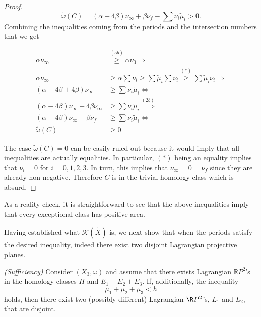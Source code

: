 \begin{proof}
\[\tilde{\omega}(C)=(\alpha-4\beta)\nu_\infty+\beta\nu_f-\sum\nu_i\tilde{\mu}_i>0.\]
Combining the inequalities coming from the periods and the intersection numbers that we get

\begin{align*}
    \alpha\nu_\infty&\overset{(5b)}\geq \alpha\nu_0\Rightarrow\\
    \alpha\nu_\infty &\geq \alpha\sum\nu_i\geq \sum \tilde{\mu}_i\sum\nu_i\overset{(*)}\geq \sum\tilde{\mu}_i\nu_i\Rightarrow\\
    (\alpha-4\beta+4\beta)\nu_\infty&\geq\sum\nu_i\tilde{\mu_i}\Leftrightarrow\\
    (\alpha-4\beta)\nu_\infty+4\beta\nu_\infty&\geq \sum\nu_i\tilde{\mu}_i\overset{(2b)}{\Rightarrow}\\
    (\alpha-4\beta)\nu_\infty+\beta\nu_f&\geq\sum\nu_i\tilde{\mu}_i\Leftrightarrow\\
    \tilde{\omega}(C)&\geq 0
\end{align*}

The case $\tilde{\omega}(C)=0$ can be easily ruled out because it would imply that all inequalities are actually equalities. In particular, $(*)$ being an equality implies that $\nu_i=0$ for $i=0,1,2,3$. In turn, this implies that $\nu_\infty=0=\nu_f$ since they are already non-negative. Therefore $C$ is in the trivial homology class which is absurd. 
\end{proof}

\begin{remark}
As a reality check, it is straightforward to see that the above inequalities imply that every exceptional class has positive area.
\end{remark}

Having established what $\mathcal{K}(\widetilde{X})$ is, we next show that when the periods satisfy the desired inequality, indeed there exist two disjoint Lagrangian projective planes.



\begin{proposition}\emph{(Sufficiency)}
Consider $(X_3,\omega)$ and assume that there exists Lagrangian $\mathbb{R}P^2$'s in the homology classes $H$ and $E_1+E_2+E_3$. If, additionally, the inequality
\[\mu_1+\mu_2+\mu_3<h\]
holds, then there exist two (possibly different) Lagrangian $\R P^2$'s, $L_1$ and $L_2$, that are disjoint.
\end{proposition}

